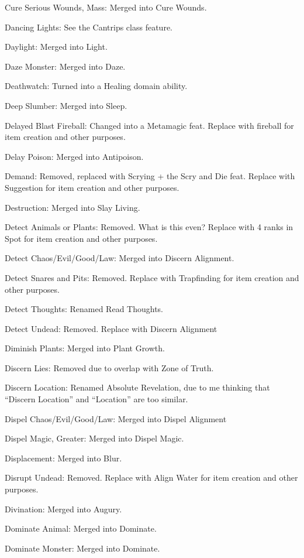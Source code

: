 {\begin{list}{}{\leftmargin=1em}
 \item Cure Serious Wounds, Mass: Merged into Cure Wounds.
 \item Dancing Lights: See the Cantrips class feature.
 \item Daylight: Merged into Light.
 \item Daze Monster: Merged into Daze.
 \item Deathwatch: Turned into a Healing domain ability.
 \item Deep Slumber: Merged into Sleep.
 \item Delayed Blast Fireball: Changed into a Metamagic feat. Replace with fireball for item creation and other purposes.
 \item Delay Poison: Merged into Antipoison.
 \item Demand: Removed, replaced with Scrying + the Scry and Die feat. Replace with Suggestion for item creation and other purposes.
 \item Destruction: Merged into Slay Living.
 \item Detect Animals or Plants: Removed. What is this even? Replace with 4 ranks in Spot for item creation and other purposes.
 \item Detect Chaos/Evil/Good/Law: Merged into Discern Alignment.
 \item Detect Snares and Pits: Removed. Replace with Trapfinding for item creation and other purposes.
 \item Detect Thoughts: Renamed Read Thoughts.
 \item Detect Undead: Removed. Replace with Discern Alignment
 \item Diminish Plants: Merged into Plant Growth.
 \item Discern Lies: Removed due to overlap with Zone of Truth.
 \item Discern Location: Renamed Absolute Revelation, due to me thinking that ``Discern Location'' and ``Location'' are too similar.
 \item Dispel Chaos/Evil/Good/Law: Merged into Dispel Alignment
 \item Dispel Magic, Greater: Merged into Dispel Magic.
 \item Displacement: Merged into Blur.
 \item Disrupt Undead: Removed. Replace with Align Water for item creation and other purposes.
 \item Divination: Merged into Augury.
 \item Dominate Animal: Merged into Dominate.
 \item Dominate Monster: Merged into Dominate.

\end{list}}
